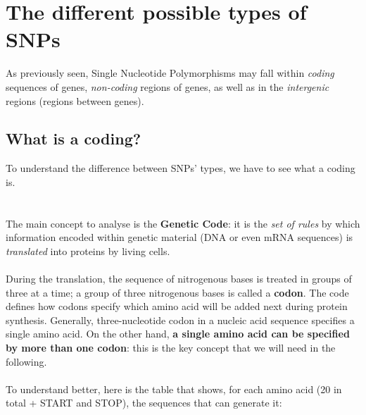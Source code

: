\section{The different possible types of SNPs}
As previously seen, Single Nucleotide Polymorphisms may fall within \emph{coding} sequences of genes, \emph{non-coding} regions of genes, as well as in the \emph{intergenic} regions (regions between genes).

\subsection{What is a coding?}
To understand the difference between SNPs’ types, we have to see what a coding is.
\\
\\
\\The main concept to analyse is the \textbf{Genetic Code}: it is the \emph{set of rules} by which information encoded within genetic material (DNA or even mRNA sequences) is \emph{translated} into proteins by living cells.
\\
\\
During the translation, the sequence of nitrogenous bases is treated in groups of three at a time; a group of three nitrogenous bases is called a \textbf{codon}. The code defines how codons specify which amino acid will be added next during protein synthesis. Generally, three-nucleotide codon in a nucleic acid sequence specifies a single amino acid. On the other hand, \textbf{a single amino acid can be specified by more than one codon}: this is the key concept that we will need in the following.
\\
\\To understand better, here is the table that shows, for each amino acid (20 in total + START and STOP), the sequences that can generate it:

